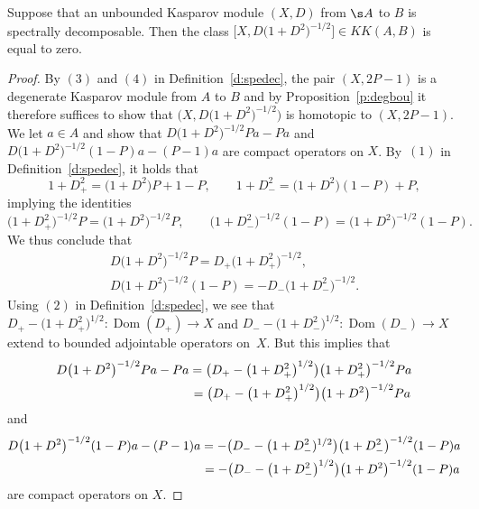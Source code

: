 \begin{lem}\label{l:spezer}
Suppose that an unbounded Kasparov module $(X,D)$ from $\s A$ to $B$ is spectrally decomposable. Then the class $\big[X,D\big(1 + D^2\big)^{-1/2}\big] \in KK(A,B)$ is equal to zero.
\end{lem}
\begin{proof}By $(3)$ and $(4)$ in Definition~\ref{d:spedec}, the pair $(X, 2 P - 1)$ is a degenerate Kasparov module from $A$ to $B$ and by Proposition~\ref{p:degbou} it therefore suffices to show that $\big(X,D\big(1 + D^2\big)^{-1/2}\big)$ is homotopic to $(X, 2P - 1)$. We let $a \in A$ and show that $D\big(1 + D^2\big)^{-1/2} P a - P a$ and $D\big(1 + D^2\big)^{-1/2}(1 - P) a - (P - 1) a$ are compact operators on $X$. By~$(1)$ in Definition~\ref{d:spedec}, it holds that
\[
1 + D_+^2 = \big(1 + D^2\big) P + 1 - P , \qquad 1 + D_-^2 = \big(1 + D^2\big)(1 - P) + P ,
\]
implying the identities
\[
\big(1 + D_+^2 \big)^{-1/2}P = \big(1 + D^2\big)^{-1/2} P , \qquad \big(1 + D_-^2\big)^{-1/2}(1-P) = \big(1 + D^2\big)^{-1/2} (1 - P) .
\]
We thus conclude that
\begin{gather*}
D\big(1 + D^2\big)^{-1/2} P = D_+ \big(1 + D_+^2\big)^{-1/2} , \\ D \big(1 + D^2\big)^{-1/2} (1 - P) = - D_- \big(1 + D_-^2 \big)^{-1/2} .
\end{gather*}
Using $(2)$ in Definition~\ref{d:spedec}, we see that $D_+ - \big(1 + D_+^2\big)^{1/2}\colon \operatorname{Dom}(D_+) \to X$ and $D_- - \big(1 + D_-^2 \big)^{1/2}\colon \operatorname{Dom}( D_-) \to X$ extend to bounded adjointable operators on~$X$. But this implies that
\begin{gather*}
 D\big(1 + D^2\big)^{-1/2} P a - P a = \big(D_+ - \big(1 + D_+^2\big)^{1/2}\big)\big(1 + D_+^2\big)^{-1/2} P a \\
\hphantom{D\big(1 + D^2\big)^{-1/2} P a - P a}{} = \big(D_+ - \big(1 + D_+^2\big)^{1/2}\big) \big(1 + D^2\big)^{-1/2} P a
\end{gather*}
and
\begin{gather*}
D\big(1 + D^2\big)^{-1/2} (1 - P) a - (P-1) a = - \big(D_- - \big(1 + D_-^2)^{1/2}\big)\big(1 + D_-^2\big)^{-1/2} (1 - P) a \\
\hphantom{D\big(1 + D^2\big)^{-1/2} (1 - P) a - (P-1) a}{} = -\big(D_- - \big(1 + D_-^2\big)^{1/2}\big) \big(1 + D^2\big)^{-1/2} (1 - P) a
\end{gather*}
are compact operators on $X$.
\end{proof}

